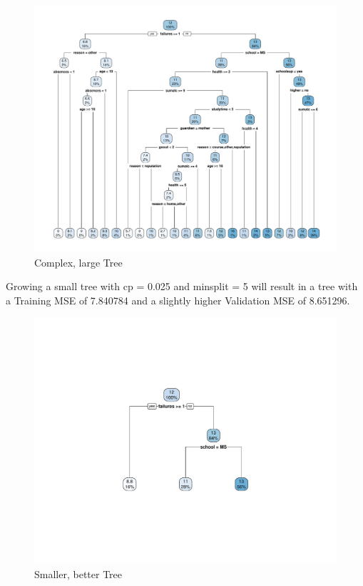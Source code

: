 \documentclass[12pt]{article}
\begin{document}
\begin{figure}
    \centering
    \includegraphics[scale=0.30]{big_manual_tree.pdf}
    \caption{Complex, large Tree}
\end{figure}


Growing a small tree with cp = 0.025 and minsplit = 5 will result in a tree with a Training MSE of 7.840784 and a slightly higher Validation MSE of 8.651296.


\begin{figure}
    \centering
    \includegraphics[scale=0.30]{small_manual_tree.pdf}
    \caption{Smaller, better Tree}
\end{figure}
\end{document}
